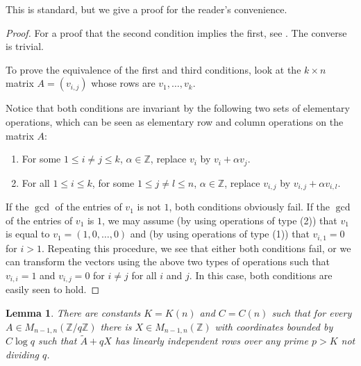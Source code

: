 \documentclass[12pt, a4paper]{amsart}
\numberwithin{equation}{section}
\newtheorem{lemma}[theorem]{Lemma}
\theoremstyle{definition}
\newcommand{\Z}{\mathbb{Z}}
\newcommand{\wt}{\widetilde}
\begin{document}
This is standard, but we give a proof for the reader's convenience.

\begin{proof}
    For a proof that the second condition implies the first, see \cite[Lecture VIII \S 1]{siegel1989lectures}.
    The converse is trivial.

    To prove the equivalence of the first and third conditions, look at the $k\times n$ matrix $A=(v_{i,j})$ whose rows are $v_1,\ldots,v_k$. 
    
    Notice that both conditions are invariant by the following two sets of elementary operations, which can be seen as elementary row and column operations on the matrix $A$: 
    \begin{enumerate}
        \item For some $1\le i\ne j\le k$, $\alpha \in \Z$, replace $v_i$ by $v_i +\alpha v_j$.
        \item For all $1\le i\le k$, for some $1\le j\ne l\le n$, $\alpha \in \Z$, replace $v_{i,j}$ by $v_{i,j}+\alpha v_{i,l}$.
    \end{enumerate}
    If the $\gcd$ of the entries of $v_1$ is not $1$, both conditions obviously fail. If the $\gcd$ of the entries of $v_1$ is $1$, we may assume (by using operations of type (2)) that $v_1$ is equal to $v_1= (1,0,\ldots,0)$ and (by using operations of type (1)) that $v_{i,1}=0$ for $i>1$. 
    Repeating this procedure, we see that either both conditions fail, or we can
    transform the vectors using the above two types of operations such that $v_{i,i}=1$
    and $v_{i,j}=0$ for $i\neq j$ for all $i$ and $j$.
    In this case, both conditions are easily seen to hold.
\end{proof}



\begin{lemma}\label{lem:large primes}
There are constants $K=K(n)$ and $C=C(n)$ such that for every $A\in M_{n-1,n}(\Z/q\Z)$
there is $X\in M_{n-1,n}(\Z)$ with coordinates bounded by $C\log q$ such that $\wt A+qX$ has linearly independent rows over
any prime $p>K$ not dividing $q$.
\end{lemma}
\end{document}
